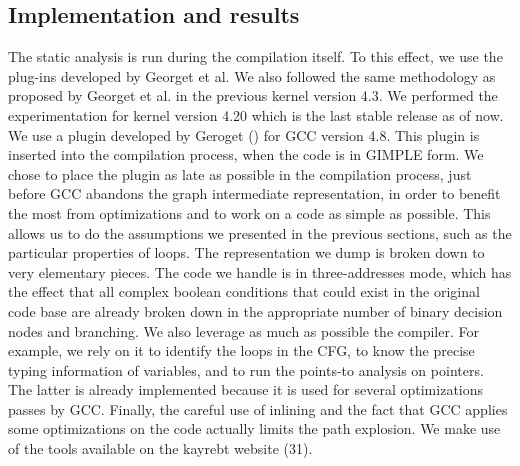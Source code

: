 \subsection{Implementation and results}
The static analysis is run during the compilation itself. To this effect, we use the plug-ins developed by Georget et al. We also followed the same methodology as proposed by Georget et al. in the previous kernel version 4.3. We performed the experimentation for kernel version 4.20 which is the last stable release as of now. 
\vskip 0.2in
We use a plugin developed by Geroget () for GCC version 4.8.  This plugin is
inserted into the compilation process, when the code is in GIMPLE
form. We chose to place the plugin as late as possible in the compilation process, just before GCC abandons the graph intermediate
representation, in order to benefit the most from optimizations
and to work on a code as simple as possible. This allows us to do
the assumptions we presented in the previous sections, such as
the particular properties of loops. The representation we dump is
broken down to very elementary pieces. The code we handle is in
three-addresses mode, which has the effect that all complex boolean
conditions that could exist in the original code base are already
broken down in the appropriate number of binary decision nodes
and branching. We also leverage as much as possible the compiler.
For example, we rely on it to identify the loops in the CFG, to know
the precise typing information of variables, and to run the points-to
analysis on pointers. The latter is already implemented because it
is used for several optimizations passes by GCC. Finally, the careful
use of inlining and the fact that GCC applies some optimizations
on the code actually limits the path explosion. We make use of the tools available on the kayrebt website (31).

